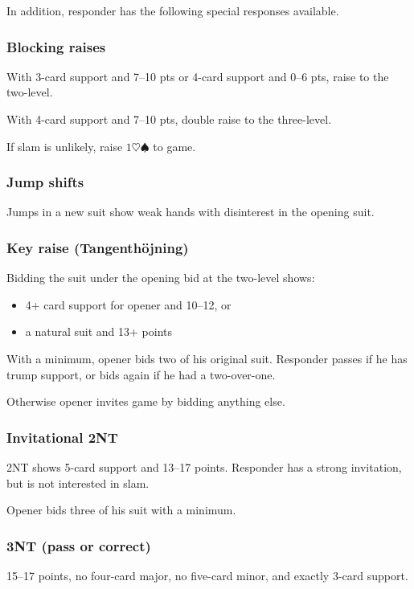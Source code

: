 \documentclass[a4paper, twoside, 11pt]{article}
\begin{document}
\begin{multicols}{3}
In addition, responder has the following special responses available.

\subsubsection*{Blocking raises}

With 3-card support and 7--10 pts or 4-card support and 0--6 pts, raise to the two-level.

With 4-card support and 7--10 pts, double raise to the three-level.

If slam is unlikely, raise $1\heartsuit\spadesuit$ to game.

\subsubsection*{Jump shifts}
Jumps in a new suit show weak hands with disinterest in the opening suit.

\subsubsection*{Key raise (Tangenthöjning)}
Bidding the suit under the opening bid at the two-level shows:
\begin{itemize}
    \item 4+ card support for opener and 10--12, or
    \item a natural suit and 13+ points
\end{itemize}

With a minimum, opener bids two of his original suit. Responder passes if he has trump support, or bids again if he had a two-over-one.

Otherwise opener invites game by bidding anything else.

\subsubsection*{Invitational \textnormal{2NT}}
\textnormal{2NT} shows 5-card support and 13--17 points. Responder has a strong invitation, but is not interested in slam.

Opener bids three of his suit with a minimum.

\subsubsection*{\textnormal{3NT} (pass or correct)}
15--17 points, no four-card major, no five-card minor, and exactly 3-card support.


\end{multicols}
\end{document}

